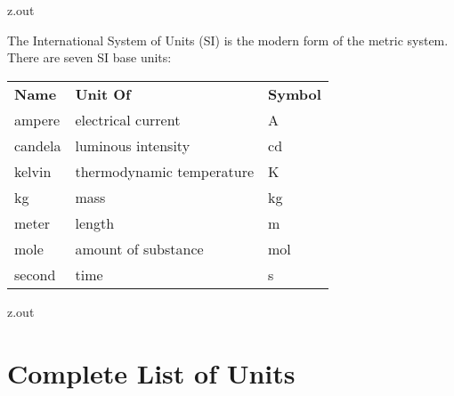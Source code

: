 \MyIO


\begin{VerbatimOut}{z.out}

The International System of Units
(SI)
is the modern form of the metric system.
There are seven SI base units:

\hspace{40pt}
\begin{tabular}{@{}lll@{}}
  \tabularspace
  \bfseries Name& \bfseries Unit Of&         \bfseries Symbol\\
  \tabularspace
  ampere&         electrical current&        \si{\ampere}\\
  candela&        luminous intensity&        \si{\candela}\\
  kelvin&         thermodynamic temperature& \si{\kelvin}\\
  kg&             mass&                      \si{\kilogram}\\
  meter&          length&                    \si{\meter}\\
  mole&           amount of substance&       \si{\mole}\\
  second&         time&                      \si{\second}\\
\end{tabular}
\end{VerbatimOut}

\MyIO


\begin{VerbatimOut}{z.out}

\section{Complete List of Units}
\label{se:Complete-List-of-Units}
\end{VerbatimOut}

\MyIO

